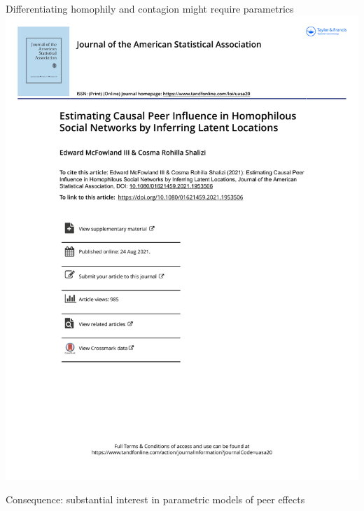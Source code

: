 \documentclass[aspectratio=169]{beamer}
\theoremstyle{remark}
\begin{document}
\begin{frame}{Differentiating homophily and contagion might require parametrics}
    \centering
    \includegraphics[width=\textwidth, page=2, trim={1.5cm 16cm 0 3.3cm}, clip]{./papers/shalizi.pdf}
    
    Consequence: substantial interest in parametric models of peer effects
\end{frame}
\end{document}
